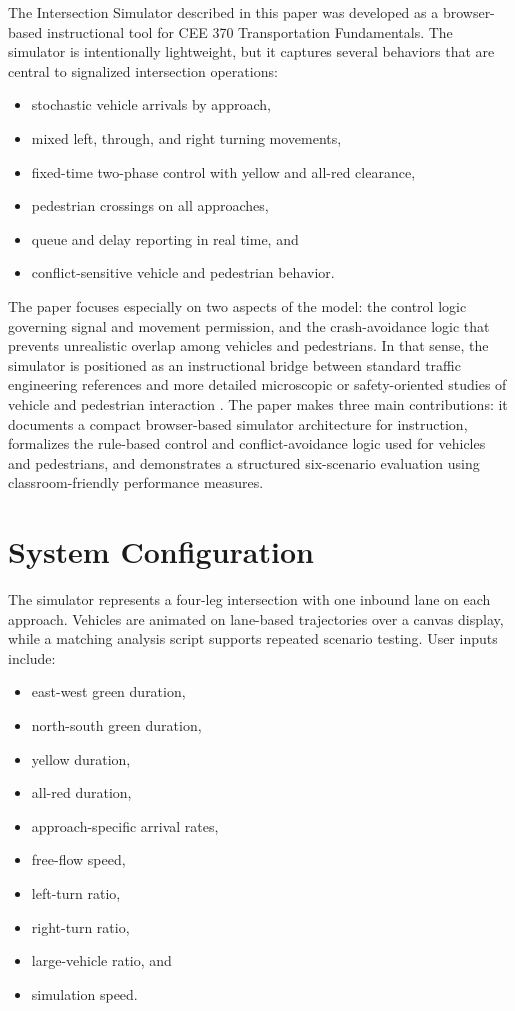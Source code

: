 \documentclass[conference]{IEEEtran}
\begin{document}
The Intersection Simulator described in this paper was developed as a browser-based instructional tool for CEE 370 Transportation Fundamentals. The simulator is intentionally lightweight, but it captures several behaviors that are central to signalized intersection operations:
\begin{itemize}
\item stochastic vehicle arrivals by approach,
\item mixed left, through, and right turning movements,
\item fixed-time two-phase control with yellow and all-red clearance,
\item pedestrian crossings on all approaches,
\item queue and delay reporting in real time, and
\item conflict-sensitive vehicle and pedestrian behavior.
\end{itemize}

The paper focuses especially on two aspects of the model: the control logic governing signal and movement permission, and the crash-avoidance logic that prevents unrealistic overlap among vehicles and pedestrians. In that sense, the simulator is positioned as an instructional bridge between standard traffic engineering references and more detailed microscopic or safety-oriented studies of vehicle and pedestrian interaction \cite{treiber2000,ni2016,zhang2020}. The paper makes three main contributions: it documents a compact browser-based simulator architecture for instruction, formalizes the rule-based control and conflict-avoidance logic used for vehicles and pedestrians, and demonstrates a structured six-scenario evaluation using classroom-friendly performance measures.

\section{System Configuration}
The simulator represents a four-leg intersection with one inbound lane on each approach. Vehicles are animated on lane-based trajectories over a canvas display, while a matching analysis script supports repeated scenario testing. User inputs include:
\begin{itemize}
\item east-west green duration,
\item north-south green duration,
\item yellow duration,
\item all-red duration,
\item approach-specific arrival rates,
\item free-flow speed,
\item left-turn ratio,
\item right-turn ratio,
\item large-vehicle ratio, and
\item simulation speed.
\end{itemize}
\end{document}
